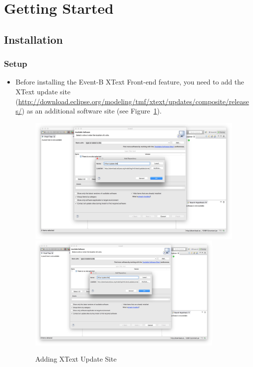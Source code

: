 \section{Getting Started}
\label{sec:getting-started}

\subsection{Installation}
\label{sec:installation}

\subsubsection{Setup}
\label{sec:setup}

\begin{itemize}
\item Before installing the Event-B XText Front-end feature, you need to add the XText update site (\url{http://download.eclipse.org/modeling/tmf/xtext/updates/composite/releases/}) as an additional software site (see Figure~\ref{fig:xtext-updatesite}).
\begin{figure}[!htbp]
  \centering
  \ifplastex
  \includegraphics[width=512]{figures/XTextUpdateSite}
  \else
  \includegraphics[width=0.9\textwidth]{figures/XTextUpdateSite}
  \fi
  \caption{Adding XText Update Site}
  \label{fig:xtext-updatesite}
\end{figure}



\end{itemize}
